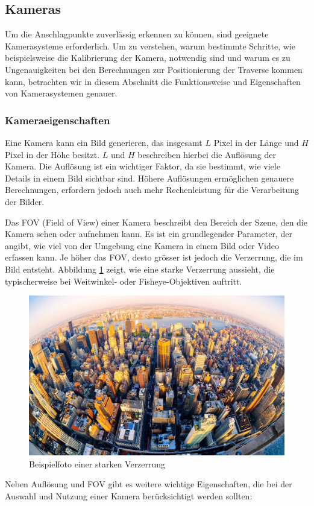 \subsection{Kameras}
Um die Anschlagpunkte zuverlässig erkennen zu können, sind geeignete Kamerasysteme
erforderlich. Um zu verstehen, warum bestimmte Schritte, wie beispielsweise die 
Kalibrierung der Kamera, notwendig sind und warum es zu Ungenauigkeiten bei den 
Berechnungen zur Positionierung der Traverse kommen kann, betrachten wir in diesem 
Abschnitt die Funktionsweise und Eigenschaften von Kamerasystemen genauer.

\subsubsection{Kameraeigenschaften}
Eine Kamera kann ein Bild generieren, das insgesamt \( L \) Pixel in 
der Länge und \( H \) Pixel in der Höhe besitzt. \( L \) und \( H \) 
beschreiben hierbei die Auflösung der Kamera. Die Auflösung ist ein 
wichtiger Faktor, da sie bestimmt, wie viele Details in einem Bild 
sichtbar sind. Höhere Auflösungen ermöglichen genauere Berechnungen, 
erfordern jedoch auch mehr Rechenleistung für die Verarbeitung der 
Bilder.

Das FOV (Field of View) einer Kamera beschreibt den Bereich der Szene,
den die Kamera sehen oder aufnehmen kann. Es ist ein grundlegender 
Parameter, der angibt, wie viel von der Umgebung eine Kamera in einem 
Bild oder Video erfassen kann. Je höher das FOV, desto grösser ist 
jedoch die Verzerrung, die im Bild entsteht.
Abbildung \ref{fig:fisheye} zeigt, wie eine starke Verzerrung aussieht,
die typischerweise bei Weitwinkel- oder Fisheye-Objektiven auftritt.

\begin{figure}[H]
    \centering
    \includegraphics[width=0.5\linewidth]{graphics/fisheye.jpg}
    \caption{Beispielfoto einer starken Verzerrung}
    \label{fig:fisheye}
\end{figure}

Neben Auflösung und FOV gibt es weitere wichtige Eigenschaften, die 
bei der Auswahl und Nutzung einer Kamera berücksichtigt werden sollten:

